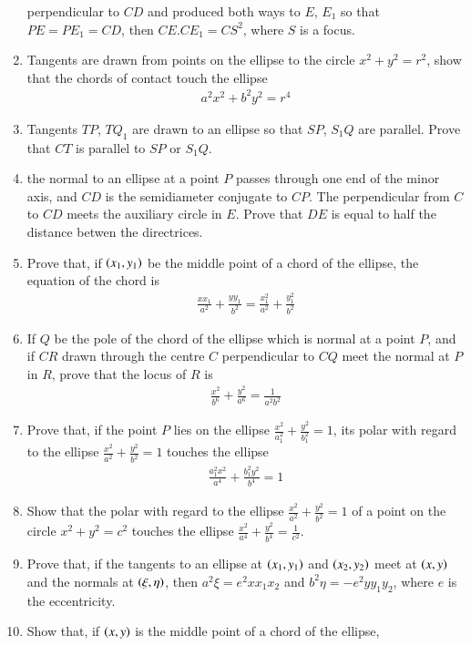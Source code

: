\begin{enumerate}[1.]
perpendicular to $CD$ and produced both ways to $E$, $E_1$ so that
$PE=PE_1=CD$, then $CE.CE_1=CS^2$, where $S$ is a focus.
\item Tangents are drawn from points on the ellipse to the circle $x^2+y^2=r^2$, show that the chords of contact touch
the ellipse
\begin{align*}
a^2x^2+b^2y^2 = r^4
\end{align*}
\item Tangents $TP$, $TQ_1$ are drawn to an ellipse so that $SP$, $S_1Q$ are parallel.  Prove that $CT$ is parallel to $SP$ or $S_1Q$.
\item the normal to an ellipse at a point $P$ passes through one end of the minor axis, and $CD$ is the semidiameter conjugate to $CP$.  The
perpendicular from $C$ to $CD$ meets the auxiliary circle in $E$.  Prove that $DE$ is equal to half the distance
betwen the directrices.
\item Prove that, if $\left(x_1,y_1\right)$ be the middle point of a chord of the ellipse, the equation of the chord is
\begin{align*}
\frac{xx_1}{a^2}+\frac{yy_1}{b^2} = \frac{x_1^2}{a^2}+\frac{y_1^2}{b^2}
\end{align*}
\item  If $Q$ be the pole of the chord of the ellipse which is normal at a point $P$, and if
$CR$ drawn through the centre $C$ perpendicular to $CQ$ meet the normal at $P$ in $R$, prove that the locus of $R$ is
\begin{align*}
\frac{x^2}{b^6}+\frac{y^2}{a^6} = \frac{1}{a^2b^2}
\end{align*}
\item Prove that, if the point $P$ lies on the ellipse $\frac{x^2}{a_1^2}+\frac{y^2}{b_1^2}=1$, its polar with regard to the 
ellipse $\frac{x^2}{a^2}+\frac{y^2}{b^2}=1$ touches
the ellipse
\begin{align*}
\frac{a_1^2x^2}{a^4}+\frac{b_1^2y^2}{b^4}=1
\end{align*}
\item Show that the polar with regard to the ellipse $\frac{x^2}{a^2}+\frac{y^2}{b^2}=1$ of a point on the circle ${x^2}+{y^2}=c^2$
 touches the ellipse $\frac{x^2}{a^4}+\frac{y^2}{b^4}=\frac{1}{c^2}$.
\item Prove that, if the tangents to an ellipse at $\left(x_1,y_1\right)$ and $\left(x_2,y_2\right)$ meet at $\left(x,y\right)$ and the normals at
$\left(\xi,\eta\right)$, then $a^2\xi=e^2xx_1x_2$ and $b^2\eta = -e^2yy_1y_2$, where $e$ is the eccentricity.
\item Show that, if $\left(x,y\right)$ is the middle point of a chord of the ellipse,

\end{enumerate}
